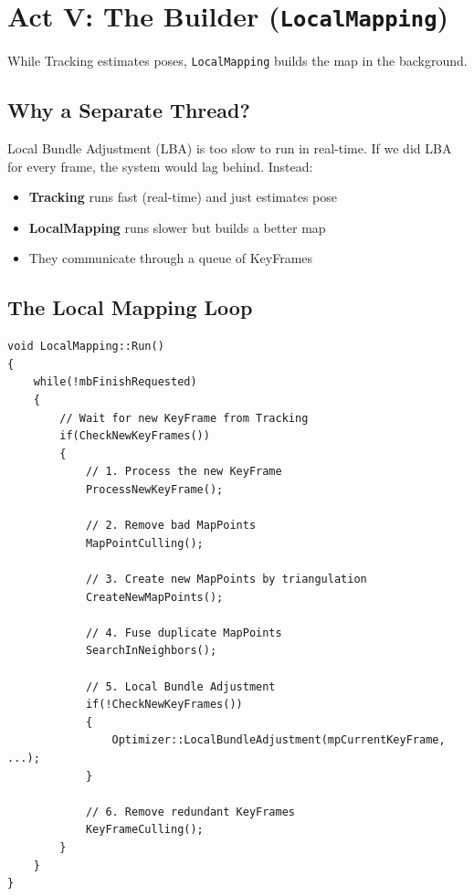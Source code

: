\section{Act V: The Builder (\texttt{LocalMapping})}

While Tracking estimates poses, \texttt{LocalMapping} builds the map in the background.

\subsection{Why a Separate Thread?}

Local Bundle Adjustment (LBA) is too slow to run in real-time. If we did LBA for every frame, the system would lag behind. Instead:

\begin{itemize}
    \item \textbf{Tracking} runs fast (real-time) and just estimates pose
    \item \textbf{LocalMapping} runs slower but builds a better map
    \item They communicate through a queue of KeyFrames
\end{itemize}

\subsection{The Local Mapping Loop}

\begin{lstlisting}[caption={LocalMapping::Run() simplified}]
void LocalMapping::Run()
{
    while(!mbFinishRequested)
    {
        // Wait for new KeyFrame from Tracking
        if(CheckNewKeyFrames())
        {
            // 1. Process the new KeyFrame
            ProcessNewKeyFrame();
            
            // 2. Remove bad MapPoints
            MapPointCulling();
            
            // 3. Create new MapPoints by triangulation
            CreateNewMapPoints();
            
            // 4. Fuse duplicate MapPoints
            SearchInNeighbors();
            
            // 5. Local Bundle Adjustment
            if(!CheckNewKeyFrames())
            {
                Optimizer::LocalBundleAdjustment(mpCurrentKeyFrame, ...);
            }
            
            // 6. Remove redundant KeyFrames
            KeyFrameCulling();
        }
    }
}
\end{lstlisting}


